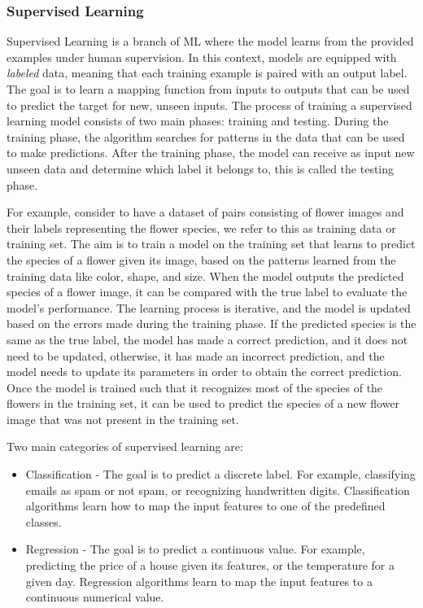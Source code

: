 \subsubsection{Supervised Learning}
\label{subsubsec:supervised_ml}
Supervised Learning is a branch of ML where the model learns from the provided examples under human supervision.
In this context, models are equipped with \textit{labeled} data, meaning that each training example is paired with an output label.
The goal is to learn a mapping function from inputs to outputs that can be used to predict the target for new, unseen inputs.
The process of training a supervised learning model consists of two main phases: training and testing.
During the training phase, the algorithm searches for patterns in the data that can be used to make predictions.
After the training phase, the model can receive as input new unseen data and determine which label it belongs to, this is called the testing phase.

For example, consider to have a dataset of pairs consisting of flower images and their labels representing the flower species, we refer to this as training data or training set.
The aim is to train a model on the training set that learns to predict the species of a flower given its image, based on the patterns learned from the training data like color, shape, and size.
When the model outputs the predicted species of a flower image, it can be compared with the true label to evaluate the model's performance.
The learning process is iterative, and the model is updated based on the errors made during the training phase.
If the predicted species is the same as the true label, the model has made a correct prediction, and it does not need to be updated, otherwise, it has made an incorrect prediction, and the model needs to update its parameters in order to obtain the correct prediction.
Once the model is trained such that it recognizes most of the species of the flowers in the training set, it can be used to predict the species of a new flower image that was not present in the training set.


Two main categories of supervised learning are:
\begin{itemize}
    \item Classification - The goal is to predict a discrete label.
    For example, classifying emails as spam or not spam, or recognizing handwritten digits.
    Classification algorithms learn how to map the input features to one of the predefined classes.

    \item Regression - The goal is to predict a continuous value.
    For example, predicting the price of a house given its features, or the temperature for a given day.
    Regression algorithms learn to map the input features to a continuous numerical value.

\end{itemize}

